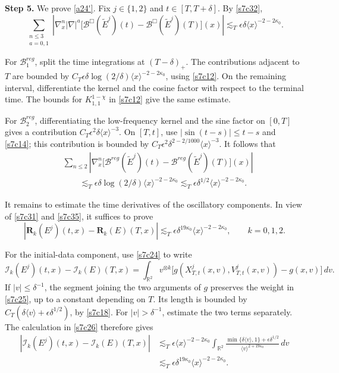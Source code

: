 \documentclass[reqno,11pt]{amsart}
\numberwithin{equation}{section}
\def\a{{\alpha}}
\def\R{{\mathbb R}}
\def\R{{\bf R}}
\def\R{\mathbb{R}}
\begin{document}
\textbf{Step 5.} We prove \eqref{a24'}.
Fix $j\in\{1,2\}$ and $t\in[T,T+\delta]$.
By \eqref{s7c32},
\begin{equation}\label{s7c35}
\sum_{\substack{n\leq3\\a=0,1}}
\left|\nabla_x^n|\nabla|^a
\big[\mathcal B^\Box(\tilde E^j)(t)
-\mathcal B^\Box(\tilde E^j)(T)\big](x)\right|
\lesssim_T\epsilon\delta\langle x\rangle^{-2-2\kappa_0}.
\end{equation}

For $\mathcal B_1^{reg}$, split the time integrations at
$(T-\delta)_+$.
The contributions adjacent to $T$ are bounded by
$C_T\epsilon\delta\log(2/\delta)
\langle x\rangle^{-2-2\kappa_0}$, using \eqref{s7c12}.
On the remaining interval, differentiate the kernel and
the cosine factor with respect to the terminal time.
The bounds for $K^{1-\chi}_{1,1}$ in \eqref{s7c12}
give the same estimate.

For $\mathcal B_2^{reg}$, differentiating the low-frequency
kernel and the sine factor on $[0,T]$ gives a contribution
$C_T\epsilon^2\delta\langle x\rangle^{-3}$.
On $[T,t]$, use $|\sin(t-s)|\leq t-s$ and
\eqref{s7c14}; this contribution is bounded by
$C_T\epsilon^2\delta^{2-2/1000}\langle x\rangle^{-3}$.
It follows that
\begin{equation}\label{s7c36}
\begin{split}
&\sum_{n\leq2}
\left|\nabla_x^n
\big[\mathcal B^{reg}(\tilde E^j)(t)
-\mathcal B^{reg}(\tilde E^j)(T)\big](x)\right|\\
&\qquad\lesssim_T
\epsilon\delta\log(2/\delta)\langle x\rangle^{-2-2\kappa_0}
\lesssim_T\epsilon\delta^{1/2}
\langle x\rangle^{-2-2\kappa_0}.
\end{split}
\end{equation}

It remains to estimate the time derivatives of the oscillatory
components. In view of \eqref{s7c31} and \eqref{s7c35},
it suffices to prove
\begin{equation}\label{s7c37}
|\mathbf R_k(E^j)(t,x)-\mathbf R_k(E)(T,x)|
\lesssim_T\epsilon\delta^{19\kappa_0}
\langle x\rangle^{-2-2\kappa_0},
\qquad k=0,1,2.
\end{equation}

For the initial-data component, use \eqref{s7c24} to write
\[
\mathcal I_k(E^j)(t,x)-\mathcal I_k(E)(T,x)
=\int_{\R^2}v^{\otimes k}
\big[g(X^j_{T,t}(x,v),V^j_{T,t}(x,v))-g(x,v)\big]\,dv.
\]
If $|v|\leq\delta^{-1}$, the segment joining the two arguments
of $g$ preserves the weight in \eqref{s7c25}, up to a
constant depending on $T$. Its length is bounded by
$C_T(\delta\langle v\rangle+\epsilon\delta^{1/2})$,
by \eqref{s7c18}.
For $|v|>\delta^{-1}$, estimate the two terms separately.
The calculation in \eqref{s7c26} therefore gives
\[
\begin{split}
|\mathcal I_k(E^j)(t,x)-\mathcal I_k(E)(T,x)|
&\lesssim_T\epsilon\langle x\rangle^{-2-2\kappa_0}
\int_{\R^2}
\frac{\min\{\delta\langle v\rangle,1\}
+\epsilon\delta^{1/2}}
{\langle v\rangle^{2+19\kappa_0}}\,dv\\
&\lesssim_T\epsilon\delta^{19\kappa_0}
\langle x\rangle^{-2-2\kappa_0}.
\end{split}
\]
\end{document}
